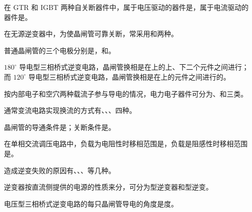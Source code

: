 \documentclass[电力电子]{subfiles}
\begin{document}
\begin{ti}
	在 GTR 和 IGBT 两种自关断器件中，属于电压驱动的器件是，属于电流驱动的器件是。
\end{ti}

\begin{ti}
	在无源逆变器中，为使晶闸管可靠关断，常采用和两种。
\end{ti}

\begin{ti}
	普通晶闸管的三个电极分别是，和。
\end{ti}

\begin{ti}
	$180^\circ$ 导电型三相桥式逆变电路，晶闸管换相是在上的上、下二个元件之间进行；而 $120^\circ$ 导电型三相桥式逆变电路，晶闸管换相是在上的元件之间进行的。
\end{ti}

\begin{ti}
	按内部电子和空穴两种载流子参与导电的情况，电力电子器件可分为、和三类。
\end{ti}

\begin{ti}
	通常变流电路实现换流的方式有、、、四种。
\end{ti}

\begin{ti}
	晶闸管的导通条件是；关断条件是。
\end{ti}

\begin{ti}
	在单相交流调压电路中，负载为电阻性时移相范围是，负载是阻感性时移相范围是。
\end{ti}

\begin{ti}
	造成逆变失败的原因有、、、等几种。
\end{ti}

\begin{ti}
	逆变器按直流侧提供的电源的性质来分，可分为型逆变器和型逆变。
\end{ti}

\begin{ti}
	电压型三相桥式逆变电路的每只晶闸管导电的角度是度。
\end{ti}
\end{document}
